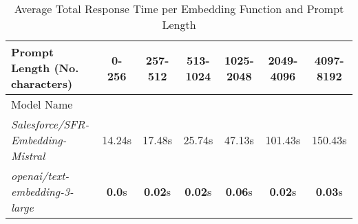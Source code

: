 
\begin{table}[H]
\centering
\scriptsize
\begin{tabular}{@{}lcccccc@{}}
\toprule
Prompt Length (No. characters) & 0-256 & 257-512 & 513-1024 & 1025-2048 & 2049-4096 & 4097-8192 \\
\midrule
Model Name &  &  &  &  &  &  \\
\textit{Salesforce/SFR-Embedding-Mistral} & 14.24s & 17.48s & 25.74s & 47.13s & 101.43s & 150.43s \\
\textit{openai/text-embedding-3-large} & \textbf{0.0}s & \textbf{0.02}s & \textbf{0.02}s & \textbf{0.06}s & \textbf{0.02}s & \textbf{0.03}s \\

\bottomrule
\end{tabular}
\caption{Average Total Response Time per Embedding Function and Prompt Length}
\label{tab:tab:average_response_time_by_length_embedding_functions}
\end{table}
